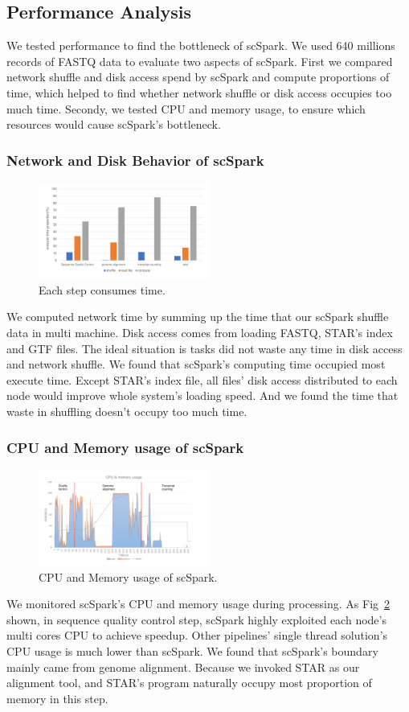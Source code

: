 \documentclass[10pt,journal,compsoc]{IEEEtran}
\begin{document}
\subsection{Performance Analysis}
We tested performance to find the bottleneck of scSpark.
We used 640 millions records of FASTQ data to evaluate two aspects of scSpark.
First we compared network shuffle and disk access spend by scSpark and compute proportions of time, which helped to find whether network shuffle or disk access occupies too much time.
Secondy, we tested CPU and memory usage, to ensure which resources would cause scSpark's bottleneck.

\subsubsection{Network and Disk Behavior of scSpark}
\begin{figure}
	\includegraphics[width=0.5\textwidth]{fig7.pdf}
	\caption{Each step consumes time.} \label{fig7}
\end{figure}
We computed network time by summing up the time that our scSpark shuffle data in multi machine. 
Disk access comes from loading FASTQ, STAR's index and GTF files. 
The ideal situation is tasks did not waste any time in disk access and network shuffle. 
We found that scSpark's computing time occupied most execute time. 
Except STAR's index file, all files' disk access distributed to each node would improve whole system's loading speed. 
And we found the time that waste in shuffling doesn't occupy too much time. 

\subsubsection{CPU and Memory usage of scSpark}
\begin{figure}
	\includegraphics[width=0.5\textwidth]{fig8.pdf}
	\caption{CPU and Memory usage of scSpark.} \label{fig8}
\end{figure}
We monitored scSpark's CPU and memory usage during processing. 
As Fig~\ref{fig8} shown, in sequence quality control step, scSpark highly exploited each node's multi cores CPU to achieve speedup. 
Other pipelines' single thread solution's CPU usage is much lower than scSpark. 
We found that scSpark's boundary mainly came from genome alignment.
Because we invoked STAR as our alignment tool, and STAR's program naturally occupy most proportion of memory in this step.
\end{document}
